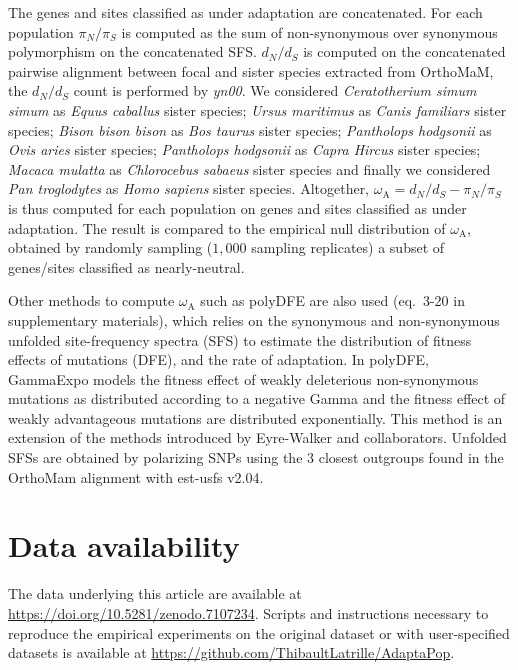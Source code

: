 \documentclass[9pt,twocolumn,twoside,lineno]{pnas-new}
\newcommand{\dn}{d_N}
\newcommand{\ds}{d_S}
\newcommand{\dnds}{\dn / \ds}
\newcommand{\rateApop}{\omega_{\mathrm{A}}}
\newcommand{\pn}{\pi_N}
\newcommand{\ps}{\pi_S}
\newcommand{\pnps}{\pn / \ps}
\begin{document}
{       The genes and sites classified as under adaptation are concatenated.
       For each population $\pnps$ is computed as the sum of non-synonymous over synonymous polymorphism on the concatenated SFS\@.
       $\dnds$ is computed on the concatenated pairwise alignment between focal and sister species extracted from OrthoMaM, the $\dnds$ count is performed by \textit{yn00}.
       We considered \textit{Ceratotherium simum simum} as \textit{Equus caballus} sister species; \textit{Ursus maritimus} as \textit{Canis familiars} sister species; \textit{Bison bison bison} as \textit{Bos taurus} sister species; \textit{Pantholops hodgsonii} as \textit{Ovis aries} sister species; \textit{Pantholops hodgsonii} as \textit{Capra Hircus} sister species; \textit{Macaca mulatta} as \textit{Chlorocebus sabaeus} sister species and finally we considered \textit{Pan troglodytes} as \textit{Homo sapiens} sister species.
       Altogether, $\rateApop = \dnds - \pnps$ is thus computed for each population on genes and sites classified as under adaptation.
       The result is compared to the empirical null distribution of $\rateApop$, obtained by randomly sampling ($1,000$ sampling replicates) a subset of genes/sites classified as nearly-neutral.

       Other methods to compute $\rateApop$ such as polyDFE\cite{tataru_polydfe_2020} are also used (eq.~3-20 in supplementary materials), which relies on the synonymous and non-synonymous unfolded site-frequency spectra (SFS) to estimate the distribution of fitness effects of mutations (DFE), and the rate of adaptation.
       In polyDFE, GammaExpo models the fitness effect of weakly deleterious non-synonymous mutations as distributed according to a negative Gamma and the fitness effect of weakly advantageous mutations are distributed exponentially.
       This method is an extension of the methods introduced by Eyre-Walker and collaborators\cite{eyre-walker_distribution_2006, eyre-walker_estimating_2009}.
       Unfolded SFSs are obtained by polarizing SNPs using the $3$ closest outgroups found in the OrthoMam alignment with est-usfs v2.04\cite{keightley_inferring_2018}.

       \section{Data availability}\label{sec:data-availability}
       The data underlying this article are available at \url{https://doi.org/10.5281/zenodo.7107234}.
       Scripts and instructions necessary to reproduce the empirical experiments on the original dataset or with user-specified datasets is available at \url{https://github.com/ThibaultLatrille/AdaptaPop}.

}
\end{document}
